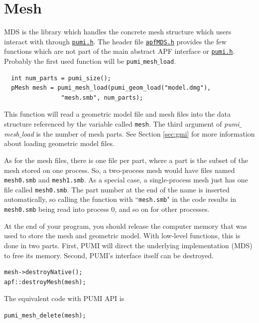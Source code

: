 \documentclass{article}
\begin{document}
\section{Mesh}
\label{sec:mds}

MDS is the library which handles the concrete mesh structure which
users interact with through \href{https://github.com/SCOREC/core/blob/master/pumi/pumi.h}{\texttt{pumi.h}}.
The header file
\href{https://github.com/SCOREC/core/blob/master/mds/apfMDS.h}{\texttt{apfMDS.h}}
provides the few functions
which are not part of the main abstract APF interface or \href{https://github.com/SCOREC/core/blob/master/pumi/pumi.h}{\texttt{pumi.h}}.
Probably the first used function will be \texttt{pumi$\_$mesh$\_$load}.

\begin{lstlisting}
  int num_parts = pumi_size();
  pMesh mesh = pumi_mesh_load(pumi_geom_load("model.dmg"),
                "mesh.smb", num_parts);
\end{lstlisting}

This function will read a geometric model file and mesh files into
the data structure referenced by the variable called \texttt{mesh}.
The third argument of \emph{pumi$\_$mesh$\_$load} is the number of mesh parts. 
See Section \ref{sec:gmi} for more information about loading
geometric model files.

As for the mesh files, there is one file per part, where a
part is the subset of the mesh stored on one process.
So, a two-process mesh would have files named \texttt{mesh0.smb}
and \texttt{mesh1.smb}.
As a special case, a single-process mesh just has one file
called \texttt{mesh0.smb}.
The part number at the end of the name is inserted automatically,
so calling the function with ``\texttt{mesh.smb}" in the code
results in \texttt{mesh0.smb} being read into process 0, and so
on for other processes.

At the end of your program, you should release the computer
memory that was used to store the mesh and geometric model.
With low-level functions, this is done in two parts.
First, PUMI will direct the underlying implementation (MDS)
to free its memory.
Second, PUMI's interface itself can be destroyed.

\begin{lstlisting}
mesh->destroyNative();
apf::destroyMesh(mesh);
\end{lstlisting}

The equivalent code with PUMI API is

\begin{lstlisting}
pumi_mesh_delete(mesh);
\end{lstlisting}
\end{document}
